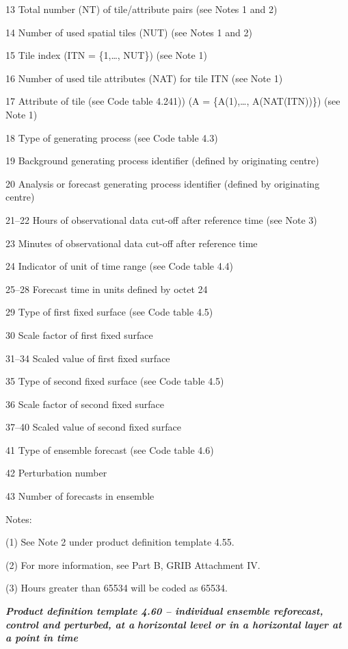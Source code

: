 13 Total number (NT) of tile/attribute pairs (see Notes 1 and 2)

14 Number of used spatial tiles (NUT) (see Notes 1 and 2)

15 Tile index (ITN = \{1,\ldots, NUT\}) (see Note 1)

16 Number of used tile attributes (NAT) for tile ITN (see Note 1)

17 Attribute of tile (see Code table 4.241)) (A = \{A(1),\ldots, A(NAT(ITN))\}) (see Note 1)

18 Type of generating process (see Code table 4.3)

19 Background generating process identifier (defined by originating centre)

20 Analysis or forecast generating process identifier (defined by originating centre)

21--22 Hours of observational data cut-off after reference time (see Note 3)

23 Minutes of observational data cut-off after reference time

24 Indicator of unit of time range (see Code table 4.4)

25--28 Forecast time in units defined by octet 24

29 Type of first fixed surface (see Code table 4.5)

30 Scale factor of first fixed surface

31--34 Scaled value of first fixed surface

35 Type of second fixed surface (see Code table 4.5)

36 Scale factor of second fixed surface

37--40 Scaled value of second fixed surface

41 Type of ensemble forecast (see Code table 4.6)

42 Perturbation number

43 Number of forecasts in ensemble

Notes:

(1) See Note 2 under product definition template 4.55.

(2) For more information, see Part B, GRIB Attachment IV.

(3) Hours greater than 65534 will be coded as 65534.

\emph{\textbf{Product definition template 4.60 -- individual ensemble reforecast, control and perturbed, at a}} \emph{\textbf{horizontal level or in a horizontal layer at a point in time}}

